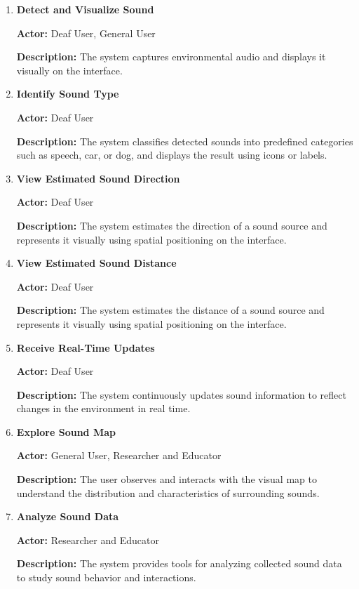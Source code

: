 \begin{enumerate}[leftmargin=80pt]

\item \textbf{Detect and Visualize Sound}
    
\textbf{Actor:} Deaf User, General User

\textbf{Description:} The system captures environmental audio and displays it visually on the interface.


\item \textbf{Identify Sound Type}

\textbf{Actor:} Deaf User

\textbf{Description:} The system classifies detected sounds into predefined categories such as speech, car, or dog, and displays the result using icons or labels.

\item \textbf{View Estimated Sound Direction}

\textbf{Actor:} Deaf User

\textbf{Description:} The system estimates the direction of a sound source and represents it visually using spatial positioning on the interface.

\item \textbf{View Estimated Sound Distance}

\textbf{Actor:} Deaf User

\textbf{Description:} The system estimates the distance of a sound source and represents it visually using spatial positioning on the interface.

\item \textbf{Receive Real-Time Updates}

\textbf{Actor:} Deaf User

\textbf{Description:} The system continuously updates sound information to reflect changes in the environment in real time.

\item \textbf{Explore Sound Map}

\textbf{Actor:} General User, Researcher and Educator

\textbf{Description:} The user observes and interacts with the visual map to understand the distribution and characteristics of surrounding sounds.

\item \textbf{Analyze Sound Data}

\textbf{Actor:} Researcher and Educator

\textbf{Description:} The system provides tools for analyzing collected sound data to study sound behavior and interactions.


\end{enumerate}
